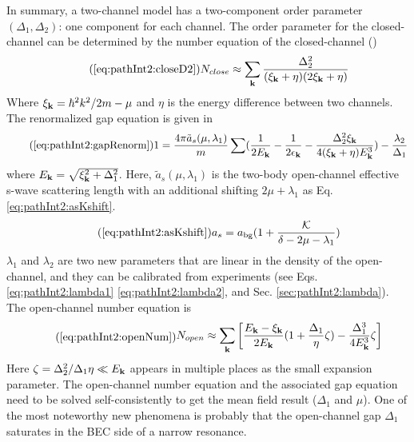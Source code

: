        In  summary, a two-channel model has a two-component order parameter $(\Delta_{1},\Delta_{2})$: one component for each channel.  The order parameter for the closed-channel can be determined by the number equation of the closed-channel ()
\begin{equation}\tag{\ref{eq:pathInt2:closeD2}}
N_{close}\approx\sum_{\vk}\frac{\Delta_{2}^2}{(\xi_{\vk}+\eta)(2\xi_{\vk}+\eta)}
\end{equation}
 Where $\xi_{\mathbf{k}}=\hbar^{2}k^{2}/2m-\mu$ and $\eta$ is the energy difference between two channels. The renormalized gap equation is given in 
 \begin{equation}\tag{\ref{eq:pathInt2:gapRenorm}}
1=\frac{4\pi{\tilde{a}_{s}(\mu,\lambda_{1})}}{m}\sum(\nth{2E_{\vk}}-\nth{2\epsilon_{\vk}}-\frac{\Delta_{2}^{2}\xi_{\vk}}{4(\xi_{\vk}+\eta){E_{\vk}^{3}}})
	-\frac{\lambda_{2}}{\Delta_{1}}
\end{equation}
where $E_{\mathbf{k}}=\sqrt{\xi_{\mathbf{k}}^{2}+\Delta_{1}^{2}}$. Here, $\tilde{a}_{s}(\mu,\lambda_{1})$ is the two-body open-channel effective  s-wave scattering length with  an additional shifting $2\mu+\lambda_{1}$ as Eq. \ref{eq:pathInt2:asKshift}. 
\begin{equation}\tag{\ref{eq:pathInt2:asKshift}}
{a}_{s}=a_{\text{bg}}(1+\frac{\mathcal{K}}{\delta-2\mu-\lambda_{1}})
\end{equation}
  $\lambda_{1}$ and $\lambda_{2}$ are two new parameters that are  linear in the density of the open-channel, and they can be calibrated from  experiments (see Eqs. \ref{eq:pathInt2:lambda1} \ref{eq:pathInt2:lambda2}, and Sec. \ref{sec:pathInt2:lambda}).  The open-channel number equation is 
\begin{equation}\tag{\ref{eq:pathInt2:openNum}}
\begin{split}
N_{open}\approx\sum_\vk\mbr{\frac{E_\vk-\xi_\vk}{2E_\vk}(1+\frac{\Delta_{1}}{\eta}\zeta)-\frac{\Delta_{1}^{3}}{4E_\vk^{3}}\zeta
	}	
\end{split}
\end{equation}
Here $\zeta=\Delta_{2}^{2}/\Delta_{1}\eta\ll{}E_{\mathbf{k}}$ appears in multiple places as the small expansion parameter.  The open-channel number equation and the associated gap equation need to be solved self-consistently to get  the mean field result ($\Delta_{1}$ and $\mu$).  One of the most noteworthy new phenomena is probably that the open-channel gap $\Delta_{1}$ saturates in the BEC side of  a narrow resonance. 

